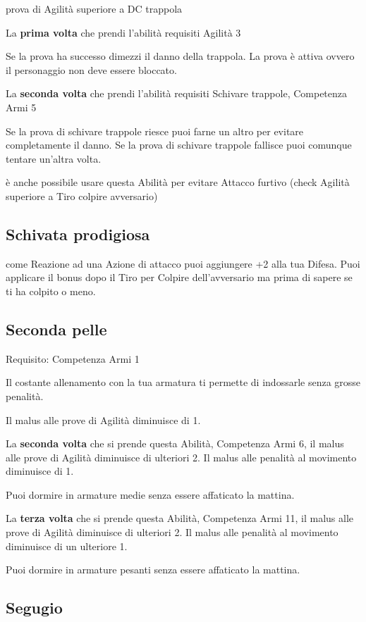 \documentclass[a4paper,11pt,twoside,openany]{book}
\begin{document}
prova di Agilità superiore a DC trappola

La \textbf{prima volta} che prendi l'abilità requisiti Agilità 3

Se la prova ha successo dimezzi il danno della trappola. La prova è attiva ovvero il personaggio non deve essere bloccato.

La \textbf{seconda volta} che prendi l'abilità requisiti Schivare trappole, Competenza Armi 5

Se la prova di schivare trappole riesce puoi farne un altro per evitare completamente il danno. Se la prova di schivare trappole fallisce puoi comunque tentare un'altra volta.

è anche possibile usare questa Abilità per evitare Attacco furtivo (check Agilità superiore a Tiro colpire avversario)

\subsection{Schivata prodigiosa}

come Reazione ad una Azione di attacco puoi aggiungere +2 alla tua Difesa. Puoi applicare il bonus dopo il Tiro per Colpire dell'avversario ma prima di sapere se ti ha colpito o meno.

\subsection{Seconda pelle}

Requisito: Competenza Armi 1

Il costante allenamento con la tua armatura ti permette di indossarle senza grosse penalità.

Il malus alle prove di Agilità diminuisce di 1.

La \textbf{seconda volta} che si prende questa Abilità, Competenza Armi 6, il malus alle prove di Agilità diminuisce di ulteriori 2. 
Il malus alle penalità al movimento diminuisce di 1.

Puoi dormire in armature medie senza essere affaticato la mattina.

La \textbf{terza volta} che si prende questa Abilità, Competenza Armi 11, il malus alle prove di Agilità diminuisce di ulteriori 2. Il malus alle penalità al movimento diminuisce di un ulteriore 1. 

Puoi dormire in armature pesanti senza essere affaticato la mattina.

\subsection{Segugio}
\end{document}
